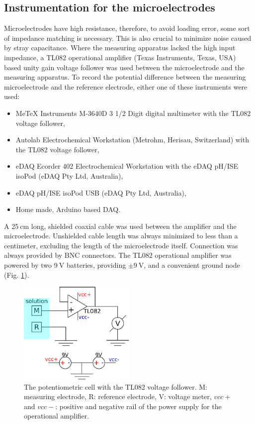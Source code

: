 \subsection{Instrumentation for the microelectrodes}
Microelectrodes have high resistance, therefore, to avoid loading error, some sort of impedance matching is necessary.
This is also crucial to minimize noise caused by stray capacitance.
Where the measuring apparatus lacked the high input impedance, a TL082 operational amplifier (Texas Instruments, Texas, USA) based unity gain voltage follower was used between the microelectrode and the measuring apparatus.
To record the potential difference between the measuring microelectrode and the reference electrode, either one of these instruments were used:

\begin{itemize}
\item MeTeX Instruments M-3640D 3 1/2 Digit digital multimeter with the TL082 voltage follower,
\item Autolab Electrochemical Workstation (Metrohm, Herisau, Switzerland) with the TL082 voltage follower,
\item eDAQ Ecorder 402 Electrochemical Workstation with the eDAQ pH/ISE isoPod (eDAQ Pty Ltd, Australia),
\item eDAQ pH/ISE isoPod USB (eDAQ Pty Ltd, Australia),
\item Home made, Arduino based DAQ.
\end{itemize}

A 25$~$cm long, shielded coaxial cable was used between the amplifier and the microelectrode.
Unshielded cable length was always minimized to less than a centimeter, excluding the length of the microelectrode itself.
Connection was always provided by BNC connectors.
The TL082 operational amplifier was powered by two 9$~$V batteries, providing $\pm 9~$V, and a convenient ground node (Fig. \ref{fig:tl082}).

\begin{figure}
\centering
\includegraphics[width=0.5\textwidth]{img/circuit.eps}
\caption[The potentiometric cell with the TL082 voltage follower.]{The potentiometric cell with the TL082 voltage follower.
M: measuring electrode, R: reference electrode, V: voltage meter, $vcc+$ and $vcc-$: positive and negative rail of the power supply for the operational amplifier.} 
\label{fig:tl082}
\end{figure}


